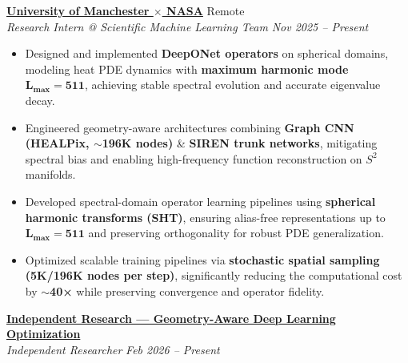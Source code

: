 \documentclass[10.5pt, a4paper]{article}
\newcommand{\resumeItem}[1]{\item[\textbullet] #1}
\newcommand{\expEntry}[4]{%
    \hspace*{-16pt}%
    \textbf{#1} \hfill #2 \\
    \hspace*{-12pt}%
    \textit{#3} \hfill \textit{#4} \\[-4pt]
    \vspace{-6pt}
}
\begin{document}
\expEntry
    {\href{https://github.com/Vision-jarvis/Spherical-PDE}{University of Manchester $\times$ NASA}}{Remote}
    {Research Intern @ Scientific Machine Learning Team}{Nov 2025 -- Present}
    \vspace{-4pt}
\begin{itemize}[leftmargin=-1pt, itemsep=1pt, topsep=-2pt, parsep=0pt]
    \resumeItem{Designed and implemented \textbf{DeepONet operators} on spherical domains, modeling heat PDE dynamics with \textbf{maximum harmonic mode  $\mathbf{L_{\max}=511}$}, achieving stable spectral evolution and accurate eigenvalue decay.}
    \resumeItem{Engineered geometry-aware architectures combining \textbf{Graph CNN (HEALPix, $\sim$196K nodes)} \& \textbf{SIREN trunk networks}, mitigating spectral bias and enabling high-frequency function reconstruction on $S^2$ manifolds.}
    \resumeItem{Developed spectral-domain operator learning pipelines using \textbf{spherical harmonic transforms (SHT)}, ensuring alias-free representations up to $\mathbf{L_{\max}=511}$ and preserving orthogonality for robust PDE generalization.}
    \resumeItem{Optimized scalable training pipelines via \textbf{stochastic spatial sampling (5K/196K nodes per step)}, significantly reducing the computational cost by \textbf{$\sim$40×} while preserving convergence and operator fidelity.}
\end{itemize}

    \vspace{1pt}

\expEntry
    {\href{https://github.com/Hamza-Faarooq/cwgd-optimizer}{Independent Research --- Geometry-Aware Deep Learning Optimization}}
    {}
    {Independent Researcher}{Feb 2026 -- Present}
    \vspace{-4pt}
\end{document}
